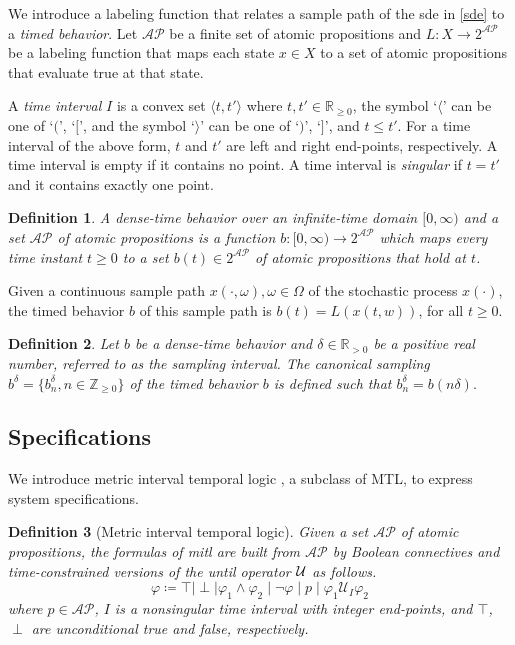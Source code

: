 \documentclass[letterpaper, 10 pt, conference]{ieeeconf}
\newtheorem{definition}{Definition}
\newcommand{\bbR}{\mathbb{R}}
\newcommand{\bbZ}{\mathbb{Z}_{\ge 0}}
\newcommand{\calAP}{\mathcal{AP}}
\begin{document}
We introduce a labeling function that relates a sample path of the
\ac{sde} in \eqref{sde} to a \emph{timed behavior}. Let $\calAP$ be
a finite set of atomic propositions and $L: X \rightarrow 2^{\calAP}$
be a labeling function that maps each state $x\in X$ to a set of
atomic propositions that evaluate true at that state.


A \emph{time interval} $I$ is a convex set $\langle t, t'\rangle$
where $t,t'\in\bbR_{\ge 0}$, the symbol `$\langle$' can be one of
`$($', `$ [$', and the symbol `$\rangle $' can be one of `$)$',
`$ ]$', and $t\le t'$. For a time interval of the above form, $t$ and
$t'$ are left and right end-points, respectively.  A time interval is
empty if it contains no point. A time interval is \emph{singular} if
$t=t'$ and it contains exactly one point.
\begin{definition} \cite{Furia2006}
  A \emph{dense-time behavior} over an infinite-time domain
  $[0, \infty)$ and a set $\calAP$ of atomic propositions is a
  function $b: [0, \infty)\rightarrow 2^{\calAP}$ which maps every
  time instant $t \ge 0$ to a set $b(t)\in 2^{\calAP}$ of atomic
  propositions that hold at $t$.
\end{definition}
Given a continuous sample path $x(\cdot,\omega), \omega \in \Omega$ of
the stochastic process $x(\cdot)$, the timed behavior $b$ of this
sample path is $b(t)= L(x(t,w))$, for all $t\ge 0$.



\begin{definition}
  \cite{Furia2006} Let $b$ be a dense-time behavior and
  $\delta \in \mathbb{R}_{>0}$ be a positive real number, referred to
  as the \emph{sampling interval}. The \emph{canonical sampling}
  $b^\delta =\{b^\delta_n, n \in \bbZ \}$ of the timed behavior $b$ is
  defined such that $b^{\delta}_n= b( n\delta).$
\end{definition}







\subsection{Specifications}


We introduce metric interval temporal logic \cite{Alur1996}, a
subclass of MTL, to express system specifications.
\begin{definition}[Metric interval temporal logic]
Given a set $\calAP$ of atomic propositions, the formulas of \ac{mitl}
are built from $\calAP$ by Boolean connectives and time-constrained
versions of the \emph{until} operator $\cal U$ as follows.
\[
\varphi\coloneqq \top \mid \perp \mid \varphi_1\land \varphi_2 \mid \neg
\varphi\mid p \mid \varphi_1 \mathcal{U}_I \varphi_2
\]
where $p \in \calAP$, $I $ is a \emph{nonsingular} time interval with
integer end-points, and $\top$, $\perp$ are unconditional true and
false, respectively.
\end{definition}
\end{document}
